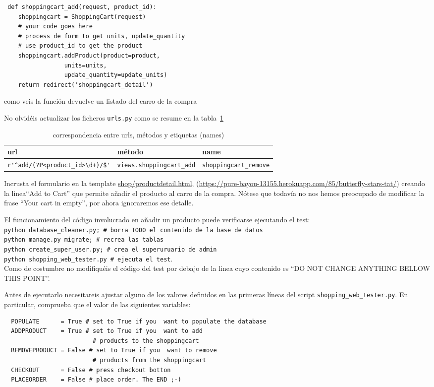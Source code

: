 \documentclass[12pt]{article} %
\newcommand{\ttt}[1]{\texttt{#1}}%
\newcommand{\urls}{\texttt{urls.py}}%
\begin{document}
\begin{lstlisting}
 def shoppingcart_add(request, product_id):
    shoppingcart = ShoppingCart(request)
    # your code goes here
    # process de form to get units, update_quantity
    # use product_id to get the product
    shoppingcart.addProduct(product=product,
                 units=units,
                 update_quantity=update_units)
    return redirect('shoppingcart_detail')

\end{lstlisting}
como veis la función devuelve un listado del carro de la compra

No olvidéis actualizar los ficheros \urls{} como se resume en la tabla~\ref{tab:urlsshoppingadd}

\begin{table}[H]
\centering
\begin{tabular}{lll}
    \textbf{url} & \textbf{método} & \textbf{name} \\ \hline
 \verb|r'^add/(?P<product_id>\d+)/$'|  & \verb|views.shoppingcart_add|  & \verb|shoppingcart_remove|\\
\end{tabular}
\caption{correspondencia entre urls, métodos y etiquetas (names) }
\label{tab:urlsshoppingadd}
\end{table}
Incrusta el formulario en la template \url{shop/productdetail.html},
(\url{https://pure-bayou-13155.herokuapp.com/85/butterfly-stars-tat/}) creando la linea``Add to Cart'' que permite añadir el producto al carro de la compra. Nótese que todavía no nos hemos preocupado de  modificar la frase ``Your cart in empty'', por ahora ignoraremos ese detalle.

El funcionamiento del código involucrado en añadir un producto puede  verificarse ejecutando el test:\\
\ttt{python database\_cleaner.py; \# borra TODO el contenido de la base de datos\\
python manage.py migrate; \# recrea las tablas\\
python create\_super\_user.py; \# crea el superuruario de admin\\
python  shopping\_web\_tester.py \# ejecuta el test}.\\ Como de costumbre no modifiquéis el código del test por debajo de la linea cuyo contenido es ``DO NOT CHANGE ANYTHING BELLOW THIS POINT''.


 Antes de ejecutarlo necesitareis ajustar alguno de los valores definidos en las primeras líneas del script \ttt{shopping\_web\_tester.py}. En particular, comprueba que el valor de las siguientes variables:
\begin{verbatim}
  POPULATE      = True # set to True if you  want to populate the database
  ADDPRODUCT    = True # set to True if you  want to add
                         # products to the shoppingcart
  REMOVEPRODUCT = False # set to True if you  want to remove
                         # products from the shoppingcart
  CHECKOUT      = False # press checkout botton
  PLACEORDER    = False # place order. The END ;-)
\end{verbatim}
 
\end{document}
